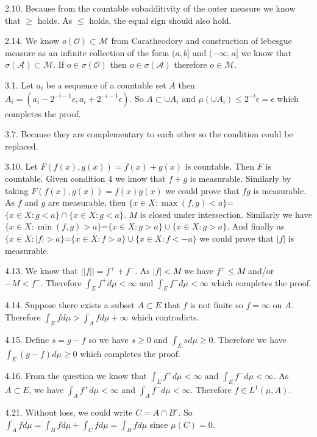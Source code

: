 \documentclass[14pt]{extreport}
\begin{document}
\begin{spacing}{1.5}
2.10. Because from the countable subadditivity of the outer measure we know that $\geq$ holds. As $\leq$ holds, the equal sign should also hold.

2.14. We know $o(\mathcal{O}) \subset \mathcal{M}$ from Caratheodory and construction of lebesgue measure as an infinite collection of the form $(a,b]$ and $(-\infty, a]$ we know that $\sigma(\mathcal{A})\subset \mathcal{M}$. If $o\in \sigma(\mathcal{O})$ then $o\in \sigma(\mathcal{A})$ therefore $o\in \mathcal{M}$.

3.1. Let $a_i$ be a sequence of a countable set $A$ then $A_i=(a_i-2^{-i-1}\epsilon,a_i+2^{-i-1}\epsilon)$. So $A\subset \cup A_i$ and $\mu( \cup A_i)\leq 2^{-i}\epsilon=\epsilon$ which completes the proof.

3.7. Because they are complementary to each other so the condition could be replaced. 

3.10. Let $F(f(x),g(x))=f(x)+g(x)$ is countable. Then $F$ is countable. Given condition 4 we know that $f+g$ is measurable. Similarly by taking $F(f(x),g(x))=f(x)g(x)$ we could prove that $fg$ is measurable. As $f$ and $g$ are measurable, then $\{x\in X:\max(f,g)<a\}$=$\{x\in X:g<a\}\cap\{x\in X:g<a\}$. $M$ is closed under intersection. Similarly we have $\{x\in X:\min(f,g)>a\}$=$\{x\in X:g>a\}\cup\{x\in X:g>a\}$. And finally as $\{x\in X:|f|>a\}$=$\{x\in X:f>a\}\cup\{x\in X:f<-a\}$ we could prove that $|f|$ is measurable.

4.13. We know that $||f||=f^{+}+f^{-}$. As $|f|<M$ we have $f^+\leq M$ and/or $-M<f^-$. Therefore $\int_E f^+d\mu<\infty$ and $\int_E f^-d\mu<\infty$ which completes the proof.

4.14. Suppose there exists a subset $A\subset E$ that $f$ is not finite so $f=\infty$ on $A$. Therefore $\int_E f d\mu>\int_A f d\mu + \infty$ which contradicts.

4.15. Define $s=g-f$ so we have $s\geq 0$ and $\int_E s d\mu \geq 0$. Therefore we have $\int_E (g-f) d\mu \geq 0$ which completes the proof.

4.16. From the question we know that $\int_E f^+ d\mu<\infty$ and  $\int_E f^- d\mu<\infty$. As $A\subset E$, we have $\int_A f^+ d\mu<\infty$ and  $\int_A f^- d\mu<\infty$. Therefore $f\in L^1(\mu,A)$.

4.21. Without loss, we could write $C=A \cap B^c$. So $\int_A f d\mu=\int_B f d\mu+\int_C f d\mu=\int_B f d\mu$ since $\mu(C)=0.$

\end{spacing}
\end{document}
